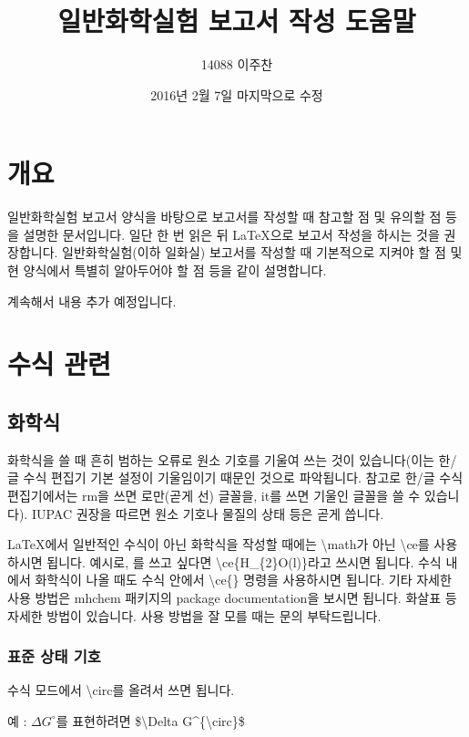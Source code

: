 \documentclass[a4paper,10pt]{article}
\begin{document}
	\title{일반화학실험 보고서 작성 도움말}	
	\author{14088 이주찬}%
	\date{2016년 2월 7일 마지막으로 수정}
	\maketitle
	\tableofcontents
	\section{개요}
	일반화학실험 보고서 양식을 바탕으로 보고서를 작성할 때 참고할 점 및 
	유의할 점 등을 설명한 문서입니다. 일단 한 번 읽은 뒤 \LaTeX 으로 보고서 
	작성을 하시는 것을 권장합니다.
	일반화학실험(이하 일화실) 보고서를 작성할 때 기본적으로 지켜야 할 점 및 
	현 양식에서 특별히 알아두어야 할 점 등을 같이 설명합니다.
	
	계속해서 내용 추가 예정입니다.
	
	\section{수식 관련}
	
	\subsection{화학식}
	화학식을 쓸 때 흔히 범하는 오류로 원소 기호를 기울여 쓰는 것이
	있습니다(이는 한/글 수식 편집기 기본 설정이 기울임이기 때문인 것으로
	파악됩니다. 참고로 한/글 수식 편집기에서는 rm을 쓰면 로만(곧게 선) 
	글꼴을, it를 쓰면 기울인 글꼴을 쓸 수 있습니다).
	IUPAC 권장을 따르면 원소 기호나 물질의 상태 등은 곧게 씁니다.
	
	\LaTeX 에서 일반적인 수식이 아닌 화학식을 작성할 때에는
	\textbackslash math가 아닌 \textbackslash ce를 사용하시면 됩니다.
	예시로, 를 쓰고 싶다면
	\textbackslash ce\{H\_\{2\}O(l)\}라고 쓰시면 됩니다.
	수식 내에서 화학식이 나올 때도 수식 안에서
	\textbackslash ce\{\} 명령을 사용하시면 됩니다.
	기타 자세한 사용 방법은 mhchem 패키지의 package documentation을
	보시면 됩니다. 화살표 등 자세한 방법이 있습니다.
	사용 방법을 잘 모를 때는 문의 부탁드립니다.
	
	\subsubsection{표준 상태 기호}
	수식 모드에서 \textbackslash circ를 올려서 쓰면 됩니다.
	
	예 : $\Delta G^{\circ}$를 표현하려면 \$\textbackslash Delta
	G\textasciicircum\{\textbackslash circ\}\$
	
\end{document}
